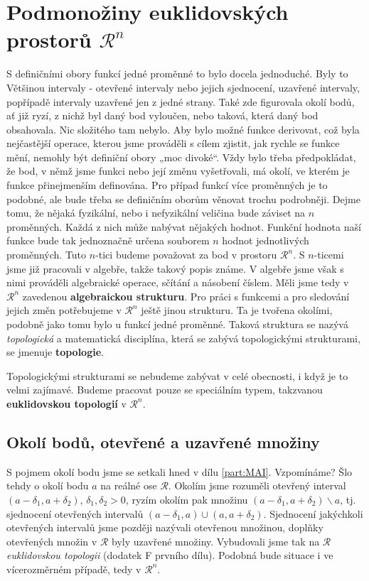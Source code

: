   \section{Podmonožiny euklidovských prostorů \(\mathcal{R}^n\)}\label{mai:IIchapVIsecI}  
    S definičními obory funkcí jedné proměnné to bylo docela jednoduché. Byly to Většinou intervaly
    - otevřené intervaly nebo jejich sjednocení, uzavřené intervaly, popřípadě intervaly uzavřené
    jen z jedné strany. Také zde figurovala okolí bodů, ať již ryzí, z nichž byl daný bod vyloučen,
    nebo taková, která daný bod obsahovala. Nic složitého tam nebylo. Aby bylo možné funkce
    derivovat, což byla nejčastější operace, kterou jsme prováděli s cílem zjistit, jak rychle se
    funkce mění, nemohly být definiční obory „moc divoké“. Vždy bylo třeba předpokládat, že bod, v
    němž jsme funkci nebo její změnu vyšetřovali, má okolí, ve kterém je funkce přinejmenším
    definována. Pro případ funkcí více proměnných je to podobné, ale bude třeba se definičním oborům
    věnovat trochu podrobněji. Dejme tomu, že nějaká fyzikální, nebo i nefyzikální veličina bude
    záviset na \(n\) proměnných. Každá z nich může nabývat nějakých hodnot. Funkční hodnota naší
    funkce bude tak jednoznačně určena souborem \(n\) hodnot jednotlivých proměnných. Tuto
    \(n\)-tici budeme považovat za bod v prostoru \(\mathcal{R}^n\). S \(n\)-ticemi jsme již
    pracovali v algebře, takže takový popis známe. V algebře jsme však s nimi prováděli algebraické
    operace, sčítání a násobení číslem. Měli jsme tedy v \(\mathcal{R}^n\) zavedenou
    \textbf{algebraickou strukturu}. Pro práci s funkcemi a pro sledování jejich změn  potřebujeme v \(\mathcal{R}^n\) ještě jinou strukturu. Ta je tvořena okolími, podobně jako
    tomu bylo u funkcí jedné proměnné. Taková struktura se nazývá \emph{topologická} a matematická
    disciplína, která se zabývá topologickými strukturami, se jmenuje \textbf{topologie}.

    Topologickými strukturami se nebudeme zabývat v celé obecnosti, i když je to velmi zajímavé.
    Budeme pracovat pouze se speciálním typem, takzvanou \textbf{euklidovskou topologií} v
    \(\mathcal{R}^n\).

    \subsection{Okolí bodů, otevřené a uzavřené množiny}
      S pojmem okolí bodu jsme se setkali hned v dílu \ref{part:MAI}. Vzpomínáme? Šlo tehdy o okolí
      bodu \(a\) na reálné ose \(\mathcal{R}\). Okolím jsme rozuměli otevřený interval \((a -
      \delta_1,a + \delta_2)\), \(\delta_1, \delta_2 > 0\), ryzím okolím pak množinu \((a -
      \delta_1, a + \delta_2)\backslash{a}\), tj. sjednocení otevřených intervalů \((a - \delta_1,
      a) \cup (a, a + \delta_2)\). Sjednocení jakýchkoli otevřených intervalů jsme později nazývali
      otevřenou množinou, doplňky otevřených množin v \(\mathcal{R}\) byly uzavřené množiny.
      Vybudovali jsme tak na \(\mathcal{R}\) \emph{euklidovskou topologii} (dodatek F prvního dílu).
      Podobná bude situace i ve vícerozměrném případě, tedy v \(\mathcal{R}^n\).

